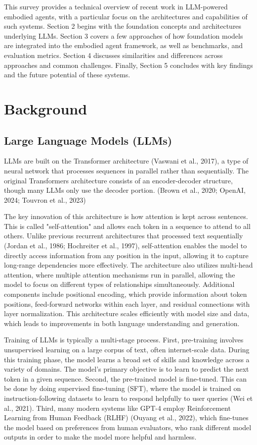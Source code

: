 \documentclass[11pt]{article}
\begin{document}
This survey provides a technical overview of recent work in LLM-powered embodied agents, with a particular focus on the architectures and capabilities of such systems. Section 2 begins with the foundation concepts and architectures underlying LLMs. Section 3 covers a few approaches of how foundation models are integrated into the embodied agent framework, as well as benchmarks, and evaluation metrics.
Section 4 discusses similarities and differences across approaches and common challenges.
Finally, Section 5 concludes with key findings and the future potential of these systems.

\section{Background}
\subsection{Large Language Models (LLMs)}
LLMs are built on the Transformer architecture (Vaswani et al., 2017), a type of neural network that processes sequences in parallel rather than sequentially. The original Transformers architecture consists of an encoder-decoder structure, though many LLMs only use the decoder portion. (Brown et al., 2020; OpenAI, 2024; Touvron et al., 2023)

The key innovation of this architecture is how attention is kept across sentences. This is  called "self-attention" and allows each token in a sequence to attend to all others. Unlike previous recurrent architectures that processed text sequentially (Jordan et al., 1986; Hochreiter et al., 1997), self-attention enables the model to directly access information from any position in the input, allowing it to capture long-range dependencies more effectively. The architecture also utilizes multi-head attention, where multiple attention mechanisms run in parallel, allowing the model to focus on different types of relationships simultaneously. Additional components include positional encoding, which provide information about token positions, feed-forward networks within each layer, and residual connections with layer normalization.
This architecture scales efficiently with model size and data, which leads to improvements in both language understanding and generation.
\hfill \break

Training of LLMs is typically a multi-stage process. First, pre-training involves unsupervised learning on a large corpus of text, often internet-scale data. During this training phase, the model learns a broad set of skills and knowledge across a variety of domains. The model's primary objective is to learn to predict the next token in a given sequence.
Second, the pre-trained model is fine-tuned. This can be done by doing supervised fine-tuning (SFT), where the model is trained on instruction-following datasets to learn to respond helpfully to user queries (Wei et al., 2021). Third, many modern systems like GPT-4 employ Reinforcement Learning from Human Feedback (RLHF) (Ouyang et al., 2022), which fine-tunes the model based on preferences from human evaluators, who rank different model outputs in order to make the model more helpful and harmless.
\end{document}
